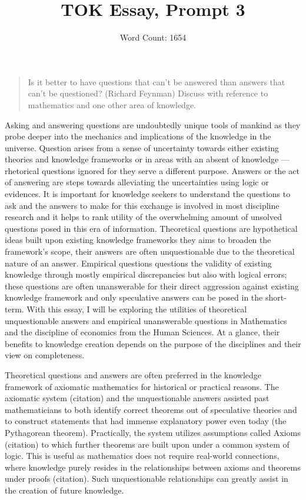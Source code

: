 \documentclass[a4paper,12pt]{article}
\title{\vspace{-8ex}TOK Essay, Prompt 3}
\author{Word Count: 1654}
\date{}
\begin{document}
\maketitle
\begin{quote}
    Is it better to have questions that can't be answered than answers that can't be questioned? (Richard Feynman) Discuss with reference to mathematics and one other area of knowledge.
\end{quote}


Asking and answering questions are undoubtedly unique tools of mankind as they probe deeper into the mechanics and implications of the knowledge in the universe. Question arises from a sense of uncertainty towards either existing theories and knowledge frameworks or in areas with an absent of knowledge --- rhetorical questions ignored for they serve a different purpose. Answers or the act of answering are steps towards alleviating the uncertainties using logic or evidences. It is important for knowledge seekers to understand the questions to ask and the answers to make for this exchange is involved in most discipline research and it helps to rank utility of the overwhelming amount of unsolved questions posed in this era of information. Theoretical questions are hypothetical ideas built upon existing knowledge frameworks they aims to broaden the framework's scope, their answers are often unquestionable due to the theoretical nature of an answer. Empirical questions questions the validity of existing knowledge through mostly empirical discrepancies but also with logical errors; these questions are often unanswerable for their direct aggression against existing knowledge framework and only speculative answers can be posed in the short-term. With this essay, I will be exploring the utilities of theoretical unquestionable answers and empirical unanswerable questions in Mathematics and the discipline of economics from the Human Sciences. At a glance, their benefits to knowledge creation depends on the purpose of the disciplines and their view on completeness.


Theoretical questions and answers are often preferred in the knowledge framework of axiomatic mathematics for historical or practical reasons. The axiomatic system (citation) and the unquestionable answers assisted past mathematicians to both identify correct theorems out of speculative theories and to construct statements that had immense explanatory power even today (the Pythagorean theorem). Practically, the system utilizes assumptions called Axioms (citation) to which further theorems are built upon under a common system of logic. This is useful as mathematics does not require real-world connections, where knowledge purely resides in the relationships between axioms and theorems under proofs (citation). Such unquestionable relationships can greatly assist in the creation of future knowledge.
\end{document}
